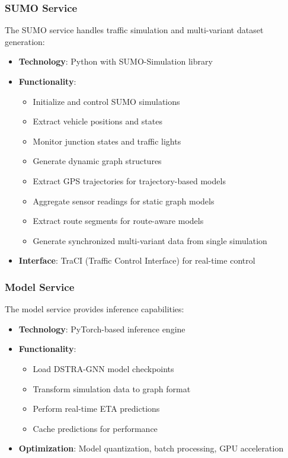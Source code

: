 \subsubsection{SUMO Service}

The SUMO service handles traffic simulation and multi-variant dataset generation:
\begin{itemize}
    \item \textbf{Technology}: Python with SUMO-Simulation library
    \item \textbf{Functionality}:
    \begin{itemize}
        \item Initialize and control SUMO simulations
        \item Extract vehicle positions and states
        \item Monitor junction states and traffic lights
        \item Generate dynamic graph structures
        \item Extract GPS trajectories for trajectory-based models
        \item Aggregate sensor readings for static graph models
        \item Extract route segments for route-aware models
        \item Generate synchronized multi-variant data from single simulation
    \end{itemize}
    \item \textbf{Interface}: TraCI (Traffic Control Interface) for real-time control
\end{itemize}

\subsubsection{Model Service}

The model service provides inference capabilities:
\begin{itemize}
    \item \textbf{Technology}: PyTorch-based inference engine
    \item \textbf{Functionality}:
    \begin{itemize}
        \item Load DSTRA-GNN model checkpoints
        \item Transform simulation data to graph format
        \item Perform real-time ETA predictions
        \item Cache predictions for performance
    \end{itemize}
    \item \textbf{Optimization}: Model quantization, batch processing, GPU acceleration
\end{itemize}


